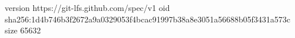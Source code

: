version https://git-lfs.github.com/spec/v1
oid sha256:1d4b746b3f2672a9a0329053f4bcac91997b38a8e3051a56688b05f3431a573c
size 65632

